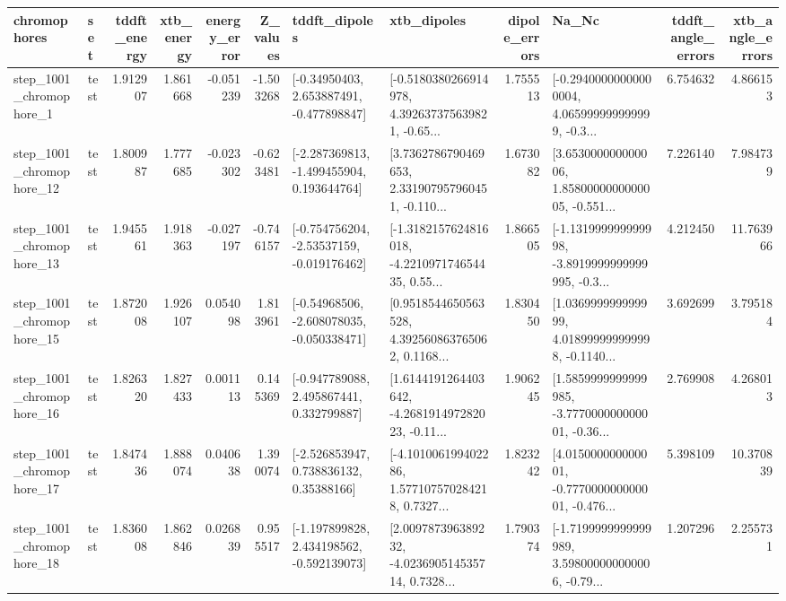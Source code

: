\begin{tabular}{llrrrrllrlrr}
\toprule
             chromophores &       set &  tddft\_energy &  xtb\_energy &  energy\_error &  Z\_values &                               tddft\_dipoles &                                        xtb\_dipoles &  dipole\_errors &                                              Na\_Nc &  tddft\_angle\_errors &  xtb\_angle\_errors \\
\midrule
  step\_1001\_chromophore\_1 &      test &      1.912907 &    1.861668 &     -0.051239 & -1.503268 &    [-0.34950403, 2.653887491, -0.477898847] &  [-0.5180380266914978, 4.392637375639821, -0.65... &       1.755513 &  [-0.29400000000000004, 4.065999999999999, -0.3... &            6.754632 &          4.866153 \\
 step\_1001\_chromophore\_12 &      test &      1.800987 &    1.777685 &     -0.023302 & -0.623481 &   [-2.287369813, -1.499455904, 0.193644764] &  [3.7362786790469653, 2.331907957960451, -0.110... &       1.673082 &  [3.653000000000006, 1.8580000000000005, -0.551... &            7.226140 &          7.984739 \\
 step\_1001\_chromophore\_13 &      test &      1.945561 &    1.918363 &     -0.027197 & -0.746157 &   [-0.754756204, -2.53537159, -0.019176462] &  [-1.3182157624816018, -4.221097174654435, 0.55... &       1.866505 &  [-1.131999999999998, -3.8919999999999995, -0.3... &            4.212450 &         11.763966 \\
 step\_1001\_chromophore\_15 &      test &      1.872008 &    1.926107 &      0.054098 &  1.813961 &   [-0.54968506, -2.608078035, -0.050338471] &  [0.9518544650563528, 4.392560863765062, 0.1168... &       1.830450 &  [1.036999999999999, 4.018999999999998, -0.1140... &            3.692699 &          3.795184 \\
 step\_1001\_chromophore\_16 &      test &      1.826320 &    1.827433 &      0.001113 &  0.145369 &    [-0.947789088, 2.495867441, 0.332799887] &  [1.6144191264403642, -4.268191497282023, -0.11... &       1.906245 &  [1.5859999999999985, -3.777000000000001, -0.36... &            2.769908 &          4.268013 \\
 step\_1001\_chromophore\_17 &      test &      1.847436 &    1.888074 &      0.040638 &  1.390074 &     [-2.526853947, 0.738836132, 0.35388166] &  [-4.101006199402286, 1.577107570284218, 0.7327... &       1.823242 &  [4.015000000000001, -0.777000000000001, -0.476... &            5.398109 &         10.370839 \\
 step\_1001\_chromophore\_18 &      test &      1.836008 &    1.862846 &      0.026839 &  0.955517 &   [-1.197899828, 2.434198562, -0.592139073] &  [2.009787396389232, -4.023690514535714, 0.7328... &       1.790374 &  [-1.7199999999999989, 3.598000000000006, -0.79... &            1.207296 &          2.255731 \\

\end{tabular}
